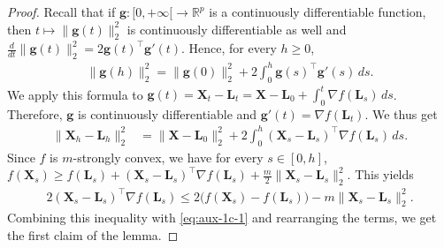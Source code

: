 \documentclass[aos,reqno]{imsart}
\newcommand\bL{\boldsymbol L}
\newcommand\bX{\boldsymbol X}
\theoremstyle{definition}
\begin{document}
\def\bsg{\boldsymbol{g}}
\begin{proof}
    Recall that if $\bsg:[0,+\infty[\to\mathbb R^p$ is a 
    continuously differentiable function, then $t\mapsto 
    \|\bsg(t)\|_2^2$ 
    is continuously differentiable as well and
    $\frac{d}{dt}\|\bsg(t)\|_2^2 = 2\bsg(t)^\top \bsg'(t)$.
    Hence, for every $h\geqslant 0$,
    \begin{align}
        \|\bsg(h)\|_2^2 = \|\bsg(0)\|_2^2 + 2\int_0^h \bsg(s)^\top \bsg'(s)\,ds.
    \end{align}
    We apply this formula to $\bsg(t) = \bX_t-\bL_t = 
    \bX-\bL_0 + \int_0^t \nabla f(\bL_s)\,ds$. 
    Therefore, $\bsg$ is continuously differentiable and
    $\bsg'(t)=\nabla f(\bL_t)$. We thus get
    \begin{align}\label{eq:aux-1c-1}
        \|\bX_h-\bL_h\|_2^2 & = \|\bX-\bL_0\|_2^2
        + 2\int_0^h (\bX_s-\bL_s)^\top \nabla f(\bL_s)\,ds.
    \end{align}
    Since $f$ is $m$-strongly convex, we have for every $s\in[0,h]$,
    $f(\bX_s) \geqslant f(\bL_s) + (\bX_s - \bL_s)^\top \nabla f(\bL_s)   
    + \frac{m}{2}\|\bX_s-\bL_s\|_2^2$.
    This yields
    \begin{align}\label{eq:lem1:3a}
        2(\bX_s-\bL_s)^\top \nabla f(\bL_s)
        \leqslant 2\big(f(\bX_s)-f(\bL_s)\big)
        - m\|\bX_s-\bL_s\|_2^2.
    \end{align}
    Combining this inequality with \eqref{eq:aux-1c-1} and
    rearranging the terms, we get the first claim of the lemma. 
    

\end{proof}
\end{document}
